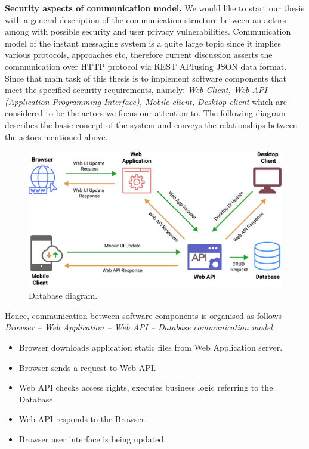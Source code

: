 \textbf{Security aspects of communication model.} We would like to start our thesis with a general description of the
communication structure between an actors among with possible security and user privacy vulnerabilities.
Communication model of the instant messaging system is a quite large topic since it implies various protocols, approaches etc,
therefore current discussion asserts the communication over HTTP protocol via REST API\@ using JSON data format.
Since that main task of this thesis is to implement software components that meet the specified security requirements,
namely: \textit{Web Client, Web API (Application Programming Interface), Mobile client, Desktop client} which are
considered to be the actors we focus our attention to.
The following diagram describes the basic concept of the system and conveys the relationships between the
actors mentioned above.

\begin{figure}[H]
    \centering
    \includegraphics[width=1\textwidth]{Pictures/Threat_Modeling}
    \caption{Database diagram.}\label{fig:figure6}
\end{figure}

Hence, communication between software components is organised as follows\\

\textit{Browser -- Web Application -- Web API -- Database communication model}
\begin{itemize}
    \item Browser downloads application static files from Web Application server.
    \item Browser sends a request to Web API\@.
    \item Web API checks access rights, executes business logic referring to the Database.
    \item Web API responds to the Browser.
    \item Browser user interface is being updated.
\end{itemize}

